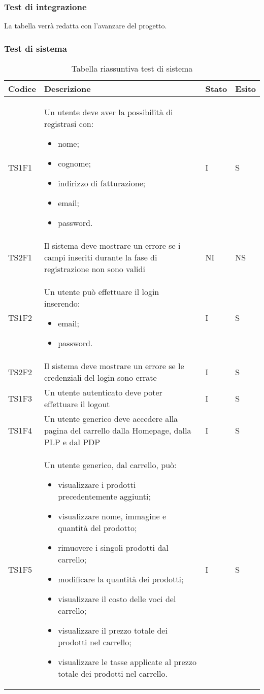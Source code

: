 \subsubsection{Test di integrazione}
La tabella verrà redatta con l'avanzare del progetto.

\subsubsection{Test di sistema}
{

\centering
\renewcommand{\arraystretch}{2}
\begin{longtable}{C{2cm} C{9.6cm} C{1.5cm} C{1cm}}
\caption{Tabella riassuntiva test di sistema}\\
\textbf{Codice} &
\textbf{Descrizione}&
\textbf{Stato}&
\textbf{Esito}\\
\endhead


TS1F1 & Un utente deve aver la possibilità di registrasi con:
\begin{itemize}
	\item nome;
	\item cognome;
	\item indirizzo di fatturazione;
	\item email;
	\item password.
\end{itemize} & I & S\\
TS2F1 & Il sistema deve mostrare un errore se
i campi inseriti durante la fase di registrazione non sono validi & NI & NS\\
TS1F2 & Un utente può effettuare il login inserendo:
\begin{itemize}
	\item email;
	\item password.
\end{itemize} & I & S\\
TS2F2 & Il sistema deve mostrare un errore se le credenziali del login sono errate & I & S\\
TS1F3 & Un utente autenticato deve poter effettuare il
logout & I & S\\
TS1F4 & Un utente generico deve accedere alla pagina del carrello dalla Homepage, dalla PLP e dal PDP & I & S\\
TS1F5 & Un utente generico, dal carrello, può:
\begin{itemize}
	\item visualizzare i prodotti precedentemente aggiunti;
	\item visualizzare nome, immagine e quantità del prodotto;
	\item rimuovere i singoli prodotti dal carrello;
	\item modificare la quantità dei prodotti;
	\item visualizzare il costo delle voci del carrello;
	\item visualizzare il prezzo totale dei prodotti nel carrello;
	\item visualizzare le tasse applicate al prezzo totale dei prodotti nel carrello.
\end{itemize}
& I & S\\


\end{longtable}}
